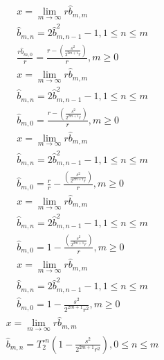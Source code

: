 \documentclass[a4paper,12pt]{report}
\begin{document}
\begin{subequations}
\begin{gather}
x = \lim \limits_{m \to \infty} r \hat{b}_{m,m} \\
\hat{b}_{m,n} = 2 \hat{b}_{m,n-1}^2 - 1, 1 \leq n \leq m \\
\frac{r \hat{b}_{m,0}}{r} = \frac{r - \left(\frac{s^2}{2^{2m+1}r}\right)}{r}, m \geq 0
\end{gather}
\end{subequations}
\begin{subequations}
\begin{gather}
x = \lim \limits_{m \to \infty} r \hat{b}_{m,m} \\
\hat{b}_{m,n} = 2 \hat{b}_{m,n-1}^2 - 1, 1 \leq n \leq m \\
\hat{b}_{m,0} = \frac{r - \left(\frac{s^2}{2^{2m+1}r}\right)}{r}, m \geq 0
\end{gather}
\end{subequations}
\begin{subequations}
\begin{gather}
x = \lim \limits_{m \to \infty} r \hat{b}_{m,m} \\
\hat{b}_{m,n} = 2 \hat{b}_{m,n-1}^2 - 1, 1 \leq n \leq m \\
\hat{b}_{m,0} = \frac{r}{r} - \frac{\left(\frac{s^2}{2^{2m+1}r}\right)}{r}, m \geq 0
\end{gather}
\end{subequations}
\begin{subequations}
\begin{gather}
x = \lim \limits_{m \to \infty} r \hat{b}_{m,m} \\
\hat{b}_{m,n} = 2 \hat{b}_{m,n-1}^2 - 1, 1 \leq n \leq m \\
\hat{b}_{m,0} = 1 - \frac{\left(\frac{s^2}{2^{2m+1}r}\right)}{r}, m \geq 0
\end{gather}
\end{subequations}
\begin{subequations}
\begin{gather}
x = \lim \limits_{m \to \infty} r \hat{b}_{m,m} \\
\hat{b}_{m,n} = 2 \hat{b}_{m,n-1}^2 - 1, 1 \leq n \leq m \\
\hat{b}_{m,0} = 1 - \frac{s^2}{2^{2m+1}r^2}, m \geq 0
\end{gather}
\end{subequations}
\begin{subequations}
\begin{gather}
x = \lim \limits_{m \to \infty} r \hat{b}_{m,m} \\
\hat{b}_{m,n} = T_2^{\circ n}\left(1 - \frac{s^2}{2^{2m+1}r^2}\right), 0 \leq n \leq m
\end{gather}
\end{subequations}
\end{document}
